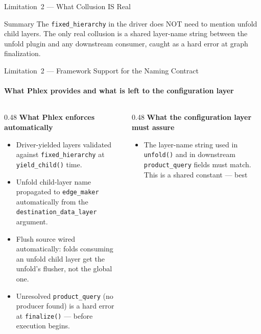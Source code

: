 \documentclass[aspectratio=169,10pt]{beamer}
\newcommand{\good}[1]{\textcolor{green!50!black}{\textbf{#1}}}
\newcommand{\warn}[1]{\textcolor{orange!80!black}{\textbf{#1}}}
\newcommand{\code}[1]{\texttt{\small #1}}
\begin{document}
\begin{frame}[fragile]{Limitation~2 --- What Collusion IS Real}
  \medskip
  \begin{exampleblock}{Summary}
    The \code{fixed\_hierarchy} in the driver does NOT need to mention unfold
    child layers.  The only real collusion is a shared layer-name string
    between the unfold plugin and any downstream consumer, caught as a hard
    error at graph finalization.
  \end{exampleblock}
\end{frame}


\begin{frame}{Limitation~2 --- Framework Support for the Naming Contract}
  \framesubtitle{What Phlex provides and what is left to the configuration layer}

  \begin{columns}[T]
    \begin{column}{0.48\textwidth}
      \textbf{What Phlex enforces automatically} \\[4pt]
      \small
      \begin{itemize}
        \item[\good{$\checkmark$}] Driver-yielded layers validated against
              \code{fixed\_hierarchy} at \code{yield\_child()} time.
        \item[\good{$\checkmark$}] Unfold child-layer name propagated
              to \code{edge\_maker} automatically from the
              \code{destination\_data\_layer} argument.
        \item[\good{$\checkmark$}] Flush source wired automatically:
              folds consuming an unfold child layer get the unfold's
              flusher, not the global one.
        \item[\good{$\checkmark$}] Unresolved \code{product\_query}
              (no producer found) is a hard error at
              \code{finalize()} --- before execution begins.
      \end{itemize}
    \end{column}
    \begin{column}{0.48\textwidth}
      \textbf{What the configuration layer must assure} \\[4pt]
      \small
      \begin{itemize}
        \item[\warn{User}] The layer-name string used in
              \code{unfold()} and in downstream \code{product\_query}
              fields must match.  This is a shared constant --- best

\end{itemize}
\end{column}
\end{columns}
\end{frame}
\end{document}
